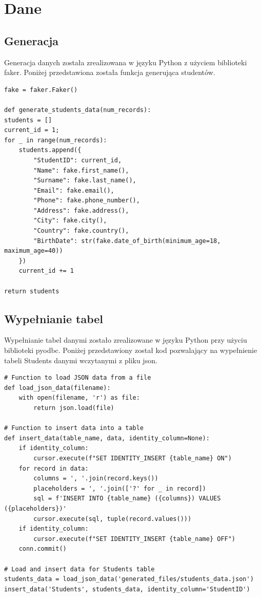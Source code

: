 \documentclass[11pt,a4paper]{article}
\begin{document}
\section{Dane}
\subsection{Generacja}
Generacja danych została zrealizowana w języku Python z użyciem biblioteki faker. Poniżej przedstawiona została funkcja generująca studentów. 
\begin{Verbatim}
fake = faker.Faker()

def generate_students_data(num_records):
students = []
current_id = 1;
for _ in range(num_records):
    students.append({
        "StudentID": current_id,
        "Name": fake.first_name(),
        "Surname": fake.last_name(),
        "Email": fake.email(),
        "Phone": fake.phone_number(),
        "Address": fake.address(),
        "City": fake.city(),
        "Country": fake.country(),
        "BirthDate": str(fake.date_of_birth(minimum_age=18, maximum_age=40))
    })
    current_id += 1

return students
\end{Verbatim}

\subsection{Wypełnianie tabel}
Wypełnianie tabel danymi zostało zrealizowane w języku Python przy użyciu biblioteki pyodbc. Poniżej przedstawiony został kod pozwalający na wypełnienie tabeli Students danymi wczytanymi z pliku json.
\begin{Verbatim}
# Function to load JSON data from a file
def load_json_data(filename):
    with open(filename, 'r') as file:
        return json.load(file)

# Function to insert data into a table
def insert_data(table_name, data, identity_column=None):
    if identity_column:
        cursor.execute(f"SET IDENTITY_INSERT {table_name} ON")
    for record in data:
        columns = ', '.join(record.keys())
        placeholders = ', '.join(['?' for _ in record])
        sql = f'INSERT INTO {table_name} ({columns}) VALUES ({placeholders})'
        cursor.execute(sql, tuple(record.values()))
    if identity_column:
        cursor.execute(f"SET IDENTITY_INSERT {table_name} OFF")
    conn.commit()

# Load and insert data for Students table
students_data = load_json_data('generated_files/students_data.json')
insert_data('Students', students_data, identity_column='StudentID')
\end{Verbatim}
\end{document}
